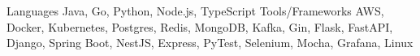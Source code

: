 \begin{cvskills}
  \cvskill
  {Languages}
  {Java, Go, Python, Node.js, TypeScript}
  \cvskill
  {Tools/Frameworks}
  {AWS, Docker, Kubernetes, Postgres, Redis, MongoDB, Kafka, Gin, Flask, FastAPI, Django, Spring Boot, NestJS, Express, PyTest, Selenium, Mocha, Grafana, Linux}
\end{cvskills}